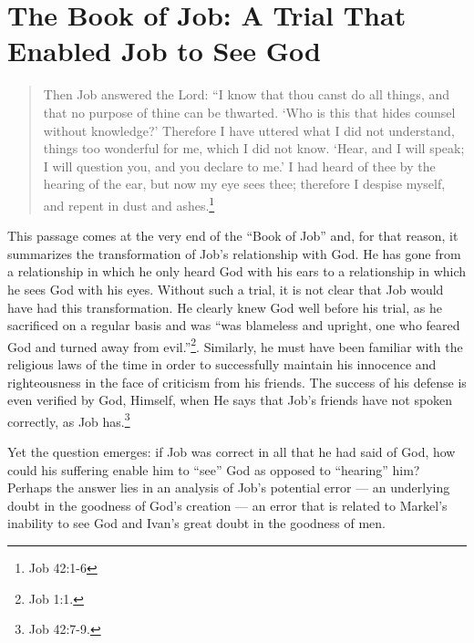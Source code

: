\section{The Book of Job: A Trial That Enabled Job to See God}
\begin{quote}
\singlespacing
Then Job answered the Lord: ``I know that thou canst do all things, and that no purpose of thine can be thwarted. `Who is this that hides counsel without knowledge?' Therefore I have uttered what I did not understand, things too wonderful for me, which I did not know. `Hear, and I will speak; I will question you, and you declare to me.' I had heard of thee by the hearing of the ear, but now my eye sees thee; therefore I despise myself, and repent in dust and ashes.\footnote{Job 42:1-6} 
\end{quote}

This passage comes at the very end of the ``Book of Job'' and, for that reason, it summarizes the transformation of Job's relationship with God. He has gone from a relationship in which he only heard God with his ears to a relationship in which he sees God with his eyes. Without such a trial, it is not clear that Job would have had this transformation. He clearly knew God well before his trial, as he sacrificed on a regular basis and was ``was blameless and upright, one who feared God and turned away from evil.''\footnote{Job 1:1.}. Similarly, he must have been familiar with the religious laws of the time in order to successfully maintain his innocence and righteousness in the face of criticism from his friends. The success of his defense is even verified by God, Himself, when He says that Job's friends have not spoken correctly, as Job has.\footnote{Job 42:7-9.}

Yet the question emerges: if Job was correct in all that he had said of God, how could his suffering enable him to ``see'' God as opposed to ``hearing'' him? Perhaps the answer lies in an analysis of Job's potential error --- an underlying doubt in the goodness of God's creation --- an error that is related to Markel's inability to see God and Ivan's great doubt in the goodness of men.

